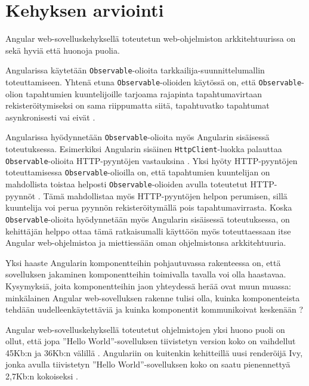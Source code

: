 \documentclass[finnish]{tktltiki2}
\theoremstyle{definition}
\theoremstyle{remark}
\numberwithin{figure}{section}
\begin{document}
\section{Kehyksen arviointi}

Angular web-sovelluskehyksellä toteutetun web-ohjelmiston arkkitehtuurissa on sekä hyviä että huonoja puolia.

Angularissa käytetään \texttt{Observable}-olioita tarkkailija-suunnittelumallin toteuttamiseen. Yhtenä etuna \texttt{Observable}-olioiden käytössä on, että \texttt{Observable}-olion tapahtumien kuuntelijoille tarjoama rajapinta tapahtumavirtaan rekisteröitymiseksi on sama riippumatta siitä, tapahtuvatko tapahtumat asynkronisesti vai eivät \cite{Observables}. 

Angularissa hyödynnetään \texttt{Observable}-olioita myös Angularin sisäisessä toteutuksessa. Esimerkiksi Angularin sisäinen \texttt{HttpClient}-luokka palauttaa \texttt{Observable}-olioita HTTP-pyyntöjen vastauksina \cite{HttpClient}. Yksi hyöty HTTP-pyyntöjen toteuttamisessa \texttt{Observable}-olioilla on, että tapahtumien kuuntelijan on mahdollista toistaa helposti \texttt{Observable}-olioiden avulla toteutetut HTTP-pyynnöt \cite{ObservablesInAngular}. Tämä mahdollistaa myös HTTP-pyyntöjen helpon perumisen, sillä kuuntelija voi perua pyynnön rekisteröitymällä pois tapahtumavirrasta. Koska \texttt{Observable}-olioita hyödynnetään myös Angularin sisäisessä toteutuksessa, on kehittäjän helppo ottaa tämä ratkaisumalli käyttöön myös toteuttaessaan itse Angular web-ohjelmistoa ja miettiessään oman ohjelmistonsa arkkitehtuuria. 

Yksi haaste Angularin komponentteihin pohjautuvassa rakenteessa on, että sovelluksen jakaminen komponentteihin toimivalla tavalla voi olla haastavaa. Kysymyksiä, joita komponentteihin jaon yhteydessä herää ovat muun muassa: minkälainen Angular web-sovelluksen rakenne tulisi olla, kuinka komponenteista tehdään uudelleenkäytettäviä ja kuinka komponentit kommunikoivat keskenään \cite{SmartVsPresentationalComponents}? 

Angular web-sovelluskehyksellä toteutetut ohjelmistojen yksi huono puoli on ollut, että jopa ''Hello World''-sovelluksen tiivistetyn version koko on vaihdellut 45Kb:n ja 36Kb:n välillä \cite{ngConf2016,ngConf2018}. Angulariin on kuitenkin kehitteillä uusi renderöijä Ivy, jonka avulla tiivistetyn ''Hello World''-sovelluksen koko on saatu pienennettyä 2,7Kb:n kokoiseksi \cite{ngConf2018,ivyStatus}.
\end{document}
